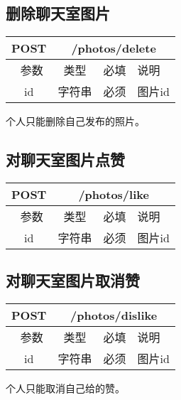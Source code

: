 \subsection{删除聊天室图片}

\begin{table}[H]
   \begin{center}
\begin{tabular}{|c|c|c|p{12cm}|}
\hline
POST & \multicolumn{3}{|c|}{/photos/delete} \\
\hline\hline
 \  参数  & 类型 & 必填 &  说明  \\
  \hline
 id  & 字符串 & 必须 & 图片id\\
\hline
\end{tabular}
   \end{center}
\end{table}
个人只能删除自己发布的照片。



\subsection{对聊天室图片点赞}

\begin{table}[H]
   \begin{center}
\begin{tabular}{|c|c|c|p{12cm}|}
\hline
POST & \multicolumn{3}{|c|}{/photos/like} \\
\hline\hline
 \  参数  & 类型 & 必填 &  说明  \\
  \hline
 id  & 字符串 & 必须 & 图片id\\
\hline
\end{tabular}
   \end{center}
\end{table}

\subsection{对聊天室图片取消赞}

\begin{table}[H]
   \begin{center}
\begin{tabular}{|c|c|c|p{12cm}|}
\hline
POST & \multicolumn{3}{|c|}{/photos/dislike} \\
\hline\hline
 \  参数  & 类型 & 必填 &  说明  \\
  \hline
 id  & 字符串 & 必须 & 图片id\\
\hline
\end{tabular}
   \end{center}
\end{table}
个人只能取消自己给的赞。


